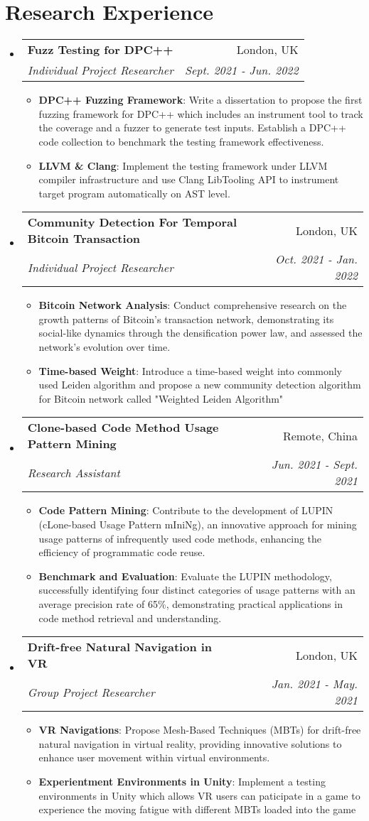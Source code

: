 \documentclass[letterpaper,11pt]{article}
\makeatletter
\newcommand{\resumeItem}[2]{
  \item\small{
    \textbf{#1}{: #2 \vspace{-2pt}}
  }
}
\newcommand{\resumeSubheading}[4]{
  \vspace{-1pt}\item
    \begin{tabular*}{0.97\textwidth}[t]{l@{\extracolsep{\fill}}r}
      \textbf{#1} & #2 \\
      \textit{\small#3} & \textit{\small #4} \\
    \end{tabular*}\vspace{-5pt}
}
\newcommand{\resumeSubHeadingListStart}{\begin{itemize}[leftmargin=*]}
\newcommand{\resumeSubHeadingListEnd}{\end{itemize}}
\newcommand{\resumeItemListStart}{\begin{itemize}}
\newcommand{\resumeItemListEnd}{\end{itemize}\vspace{-5pt}}
\makeatother
\begin{document}
\section{Research Experience}
  \resumeSubHeadingListStart
    \resumeSubheading
    {Fuzz Testing for DPC++}{London, UK}
    {Individual Project Researcher}{Sept. 2021 - Jun. 2022}
    \resumeItemListStart
      \resumeItem{DPC++ Fuzzing Framework}
          {Write a dissertation to propose the first fuzzing framework for DPC++ which includes an instrument tool to track the coverage and a fuzzer to generate test inputs. Establish a DPC++ code collection to benchmark the testing framework effectiveness.}
      \resumeItem{LLVM \& Clang}
          {Implement the testing framework under LLVM compiler infrastructure and use Clang LibTooling API to instrument target program automatically on AST level.}
    \resumeItemListEnd
    \resumeSubheading
    {Community Detection For Temporal Bitcoin Transaction}{London, UK}
    {Individual Project Researcher}{Oct. 2021 - Jan. 2022}
    \resumeItemListStart
      \resumeItem{Bitcoin Network Analysis}
          {Conduct comprehensive research on the growth patterns of Bitcoin's transaction network, demonstrating its social-like dynamics through the densification power law, and assessed the network's evolution over time.}
      \resumeItem{Time-based Weight}
          {Introduce a time-based weight into commonly used Leiden algorithm and propose a new community detection algorithm for Bitcoin network called "Weighted Leiden Algorithm"}
    \resumeItemListEnd
    \resumeSubheading
    {Clone-based Code Method Usage Pattern Mining}{Remote, China}
    {Research Assistant}{Jun. 2021 - Sept. 2021}
    \resumeItemListStart
      \resumeItem{Code Pattern Mining}
          {Contribute to the development of LUPIN (cLone-based Usage Pattern mIniNg), an innovative approach for mining usage patterns of infrequently used code methods, enhancing the efficiency of programmatic code reuse.}
      \resumeItem{Benchmark and Evaluation}
          {Evaluate the LUPIN methodology, successfully identifying four distinct categories of usage patterns with an average precision rate of 65\%, demonstrating practical applications in code method retrieval and understanding.}
    \resumeItemListEnd
    \resumeSubheading
    {Drift-free Natural Navigation in VR}{London, UK}
    {Group Project Researcher}{Jan. 2021 - May. 2021 }
    \resumeItemListStart
      \resumeItem{VR Navigations}
          {Propose Mesh-Based Techniques (MBTs) for drift-free natural navigation in virtual reality, providing innovative solutions to enhance user movement within virtual environments.}
      \resumeItem{Experientment Environments in Unity}
          {Implement a testing environments in Unity which allows VR users can paticipate in a game to experience the moving fatigue with different MBTs loaded into the game}
    \resumeItemListEnd
  \resumeSubHeadingListEnd
\end{document}
